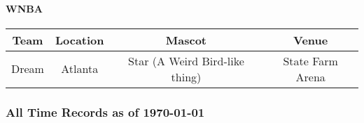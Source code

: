 				\paragraph{WNBA}
				\begin{center}
					\begin{tabular}{|c|c|c|c |}
						\hline
						\textbf{Team} & \textbf{Location} & \textbf{Mascot} & \textbf{Venue} \\
							\hline
						Dream & Atlanta & Star (A Weird Bird-like thing) & State Farm Arena \\
						\hline
						
					\end{tabular}
				\end{center}								
				
			\subsubsection{All Time Records as of \today}
